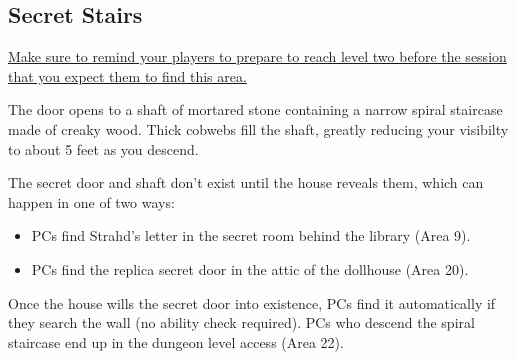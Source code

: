 \begin{arealinks}
\end{arealinks}


\pagebreak
\subsection{Secret Stairs}
\label{sec:SecretStairs}
\uline{Make sure to remind your players to prepare to reach level two before the session that you expect
them to find this area.}
\begin{readout}
  The door opens to a shaft of mortared stone containing a narrow spiral staircase made of creaky wood.
  Thick cobwebs fill the shaft, greatly reducing your visibilty to about 5 feet as you descend.
\end{readout}
The secret door and shaft don't exist until the house reveals them, which can happen in one of two ways:
\begin{itemize}
  \item PCs find Strahd's letter in the secret room behind the library (Area 9).
  \item PCs find the replica secret door in the attic of the dollhouse (Area 20).
\end{itemize}
Once the house wills the secret door into existence, PCs find it automatically if they search the wall
(no ability check required). PCs who descend the spiral staircase end up in the dungeon level access (Area 22).

\begin{arealinks}
\end{arealinks}

